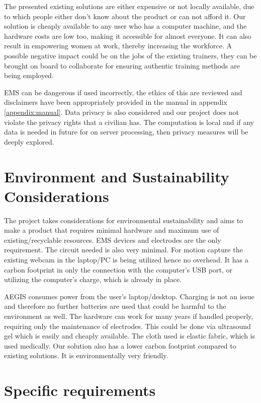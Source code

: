 The presented existing solutions are either expensive or not locally available, due to which people either don't know about the product or can not afford it. 
Our solution is cheaply available to any user who has a computer machine, and the hardware costs are low too, making it accessible for almost everyone. It can also result in empowering women at work, thereby increasing the workforce.  
A possible negative impact could be on the jobs of the existing trainers, they can be brought on board to collaborate for ensuring authentic training methods are being employed. 

EMS can be dangerous if used incorrectly, the ethics of this are reviewed and disclaimers have been appropriately provided in the manual in appendix \ref{appendix:manual}. Data privacy is also considered and our project does not violate the privacy rights that a civilian has. The computation is local and if any data is needed in future for on server processing, then privacy measures will be deeply explored.

\section{Environment and Sustainability Considerations}

The project takes considerations for environmental sustainability and aims to make a product that requires minimal hardware and maximum use of existing/recyclable resources. EMS devices and electrodes are the only requirement. The circuit needed is also very minimal. For motion capture the existing webcam in the laptop/PC is being utilized hence no overhead. It has a carbon footprint in only the connection with the computer's USB port, or utilizing the computer's charge, which is already in place. 


AEGIS consumes power from the user's laptop/desktop. Charging is not an issue and therefore no further batteries are used that could be harmful to the environment as well.
The hardware can work for many years if handled properly, requiring only the maintenance of electrodes. This could be done via ultrasound gel which is easily and cheaply available. The cloth used is elastic fabric, which is used medically. Our solution also has a lower carbon footprint compared to existing solutions. It is environmentally very friendly.

\section{Specific requirements}

